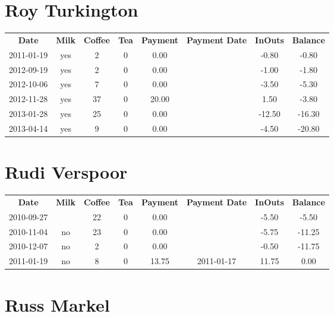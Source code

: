 \section{Roy Turkington}

\begin{center}
\begin{tabular}{cccccccc}
\textbf{Date} & \textbf{Milk} & \textbf{Coffee} & \textbf{Tea} & \textbf{Payment} & \textbf{Payment Date} & \textbf{InOuts} & \textbf{Balance} \\
2011-01-19 & yes &  2 & 0 &  0.00 &  &  -0.80 &  -0.80\\ 
2012-09-19 & yes &  2 & 0 &  0.00 &  &  -1.00 &  -1.80\\ 
2012-10-06 & yes &  7 & 0 &  0.00 &  &  -3.50 &  -5.30\\ 
2012-11-28 & yes & 37 & 0 & 20.00 &  &   1.50 &  -3.80\\ 
2013-01-28 & yes & 25 & 0 &  0.00 &  & -12.50 & -16.30\\ 
2013-04-14 & yes &  9 & 0 &  0.00 &  &  -4.50 & -20.80
\end{tabular}
\end{center}

\section{Rudi Verspoor}

\begin{center}
\begin{tabular}{cccccccc}
\textbf{Date} & \textbf{Milk} & \textbf{Coffee} & \textbf{Tea} & \textbf{Payment} & \textbf{Payment Date} & \textbf{InOuts} & \textbf{Balance} \\
2010-09-27 &  & 22 & 0 &  0.00 &  & -5.50 &  -5.50\\ 
2010-11-04 & no & 23 & 0 &  0.00 &  & -5.75 & -11.25\\ 
2010-12-07 & no &  2 & 0 &  0.00 &  & -0.50 & -11.75\\ 
2011-01-19 & no &  8 & 0 & 13.75 & 2011-01-17 & 11.75 &   0.00
\end{tabular}
\end{center}

\section{Russ Markel}

